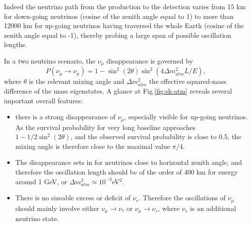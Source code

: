 Indeed the neutrino path from the production to the detection varies from 15 km for down-going neutrinos (cosine of the zenith angle equal to 1) to more than 12000 km for up-going neutrinos having traversed the whole Earth (cosine of the zenith angle equal to -1), thereby probing a large span of possible oscillation lengths. 

In a two neutrino scenario, the $\nu_\mu$ disappearance is governed by 
\begin{equation}
P(\nu_\mu \rightarrow \nu_\mu) = 1 - \sin^2 (2 \theta) \sin^2 (4 \Delta m^2_{atm} L /E),
\end{equation}
where $\theta$ is the relevant mixing angle and $\Delta m^2_{atm}$ the effective squared-mass difference of the mass eigenstates. A glance at Fig.\ref{fig:sk-atm} reveals several important overall features: 
\begin{itemize}
\item there is a strong disappearance of $\nu_\mu$, especially visible for up-going neutrinos. As the survival probability for very long baseline approaches $1- 1/2 \sin^2 (2 \theta)$, and the observed survival probability is close to 0.5, the mixing angle is therefore close to the maximal value $\pi/4$. 
\item The disappearance sets in for neutrinos close to horizontal zenith angle, and therefore the oscillation length should be of the order of 400 km for energy around 1 GeV, or $\Delta m^2_{atm} \simeq 10^{-3}$eV$^2$.  
\item There is no sizeable excess or deficit of $\nu_e$. Therefore the oscillations of $\nu_{\mu}$ should mainly involve either $\nu_{\mu} \rightarrow \nu_{\tau}$ or $\nu_{\mu} \rightarrow \nu_s$, where $\nu_s$ is an additional neutrino state.
\end{itemize}


